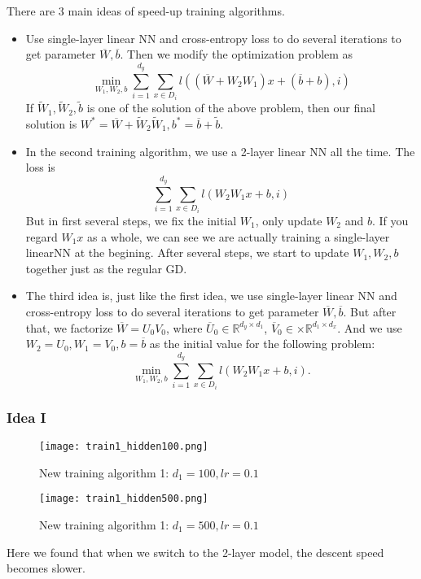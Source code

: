 There are 3 main ideas of speed-up training algorithms.
\begin{itemize}
	\item  Use single-layer linear NN and cross-entropy loss to do several iterations to get parameter $\overline{W}, \overline{b}$. Then we modify the optimization problem as
	\begin{equation}
		\min_{W_1,W_2,b}\sum_{i = 1}^{d_y} \sum_{x\in D_i} l((\overline{W}+W_2 W_1)x + (\overline{b}+b), i) 
	\end{equation}
	If $\tilde{W}_1,\tilde{W}_2,\tilde{b}$ is one of the solution of the above problem, then our final solution is $W^* = \overline{W} + \tilde{W}_2\tilde{W}_1, b^* = \overline{b} + \tilde{b}$.\\
	
	\item In the second training algorithm, we use a 2-layer linear NN all the time. The loss is 
	\begin{equation}
	\sum_{i = 1}^{d_y} \sum_{x\in D_i} l(W_2 W_1x + b, i) 
	\end{equation}
	 But in first several steps, we fix the initial $W_1$, only update $W_2$ and $b$. If you regard $W_1 x$ as a whole, we can see we are actually training a single-layer linearNN at the begining. After several steps, we start to update $W_1,W_2,b$ together just as the regular GD.\\
	 
	 \item The third idea is, just like the first idea, we use single-layer linear NN and cross-entropy loss to do several iterations to get parameter $\overline{W}, \overline{b}$. But after that, we factorize $\overline{W} = U_0 V_0$, where $\overline{U}_0\in \mathbb{R}^{d_y\times d_1}$, $\overline{V}_0\in\times \mathbb{R}^{d_1\times d_x}$. And we use $W_2 = U_0, W_1 = V_0, b = \overline{b}$ as the initial value for the following problem:
	 \begin{equation}
	 \min_{W_1,W_2,b} \sum_{i = 1}^{d_y} \sum_{x\in D_i} l(W_2 W_1x + b, i) .
	 \end{equation}

	 
\end{itemize}

\subsubsection{Idea I}
\begin{figure}[H]
	\centering
	\texttt{[image: train1\_hidden100.png]}
	\caption{New training algorithm 1: $d_1 = 100, lr = 0.1$}
\end{figure}
\begin{figure}[H]
	\centering
	\texttt{[image: train1\_hidden500.png]}
	\caption{New training algorithm 1: $d_1 = 500, lr = 0.1$}
\end{figure}
Here we found that when we switch to the 2-layer model, the descent speed becomes slower.

